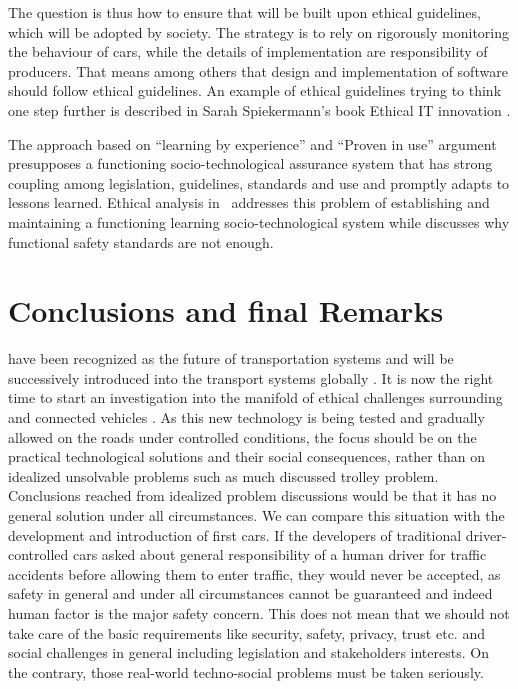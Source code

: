 The question is thus how to ensure that  will be built upon ethical guidelines, which will be adopted by society. The strategy is to rely on rigorously monitoring the behaviour of cars, while the details of implementation are responsibility of producers. That means among others that design and implementation of software should follow ethical guidelines. An example of ethical guidelines trying to think one step further is described in Sarah Spiekermann's book Ethical IT innovation \cite{spiekermann2015ethical}. 

The approach based on \enquote{learning by experience} and \enquote{Proven in use} argument \cite{GovernmentNL2017,NationalInstruments2014a,DBLP:journals/corr/SchabeB15} presupposes a functioning socio-technological assurance system that has strong coupling among legislation, guidelines, standards and use and promptly adapts to lessons learned. Ethical analysis in~\cite{DodigCrnkovic2012, Thekkilakattil_7273594,Johnsen2017_7958474} addresses this problem of establishing and maintaining a functioning learning socio-technological system while \cite{Johnsen2017_7958474} discusses why functional safety standards are not enough.


\section{Conclusions and final Remarks}
\label{sec:Conclusions}
 have been recognized as the future of transportation systems and will be successively introduced into the transport systems globally \cite{EthicsCommission2017pr,Pillath2016,NHTSA2016PolicyUpdate}. It is now the right time to start an investigation into the manifold of ethical challenges surrounding  and connected vehicles \cite{EthicsCommission2017b}. As this new technology is being tested and gradually allowed on the roads under controlled conditions, the focus should be on the practical technological solutions and their social consequences, rather than on idealized unsolvable problems such as much discussed trolley problem. Conclusions reached from idealized problem discussions would be that it has no general solution under all circumstances. We can compare this situation with the development and introduction of first cars. If the developers of traditional driver-controlled cars asked about general responsibility of a human driver for traffic accidents before allowing them to enter traffic, they would never be accepted, as safety in general and under all circumstances cannot be guaranteed and indeed human factor is the major safety concern. This does not mean that we should not take care of the basic requirements like security, safety, privacy, trust etc. and social challenges in general including legislation and stakeholders interests. On the contrary, those real-world techno-social problems must be taken seriously.

